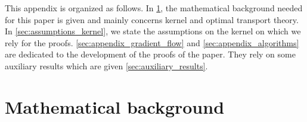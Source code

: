 

This appendix is organized as follows. In \cref{sec:appendix_math_background}, the mathematical background needed for this paper is given and mainly concerns kernel and optimal transport theory. In \cref{sec:assumptions_kernel}, we state the assumptions on the kernel on which we rely for the proofs. \cref{sec:appendix_gradient_flow} and  \cref{sec:appendix_algorithms} are dedicated to the development of the proofs of the paper. They {\tiny }rely on some auxiliary results which are given \cref{sec:auxiliary_results}.


\section{Mathematical background}\label{sec:appendix_math_background}

